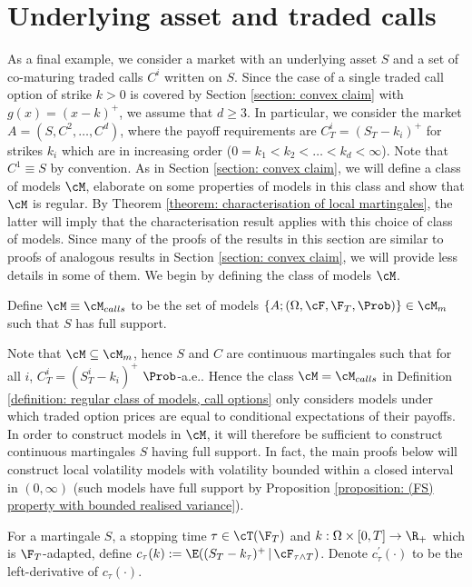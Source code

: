\documentclass[11pt]{article}
\begin{document}
\section{Underlying asset and traded calls}
\label{section: traded calls}

As a final example, we consider a market with an underlying asset $S$ and a set of co-maturing traded calls $C^i$ written on $S$. Since the case of a single traded call option of strike $k > 0$ is covered by Section \ref{section: convex claim} with $g(x) = (x-k)^+$, we assume that $d \geq 3$. In particular, we consider the market $A = (S, C^2, \ldots, C^d)$, where the payoff requirements are $C^i_T = (S_T - k_i)^+$ for strikes $k_i$ which are in increasing order ($0 = k_1 < k_2 < \ldots < k_d < \infty$). Note that $C^1 \equiv S$ by convention. As in Section \ref{section: convex claim}, we will define a class of models $\cM$, elaborate on some properties of models in this class and show that $\cM$ is regular. By Theorem \ref{theorem: characterisation of local martingales}, the latter will imply that the characterisation result applies with this choice of class of models. Since many of the proofs of the results in this section are similar to proofs of analogous results in Section \ref{section: convex claim}, we will provide less details in some of them. We begin by defining the class of models $\cM$.

\begin{definition}
\label{definition: regular class of models, call options}
Define $\cM \equiv \cM_{calls}$ to be the set of models $\{ A; (\Omega, \cF, \F_T, \Prob) \} \in \cM_m$ such that $S$ has full support.
\end{definition}

Note that $\cM \subseteq \cM_m$, hence $S$ and $C$ are continuous martingales such that for all $i$, $C^i_T = (S^i_T - k_i)^+$ $\Prob$-a.e.. Hence the class $\cM = \cM_{calls}$ in Definition \ref{definition: regular class of models, call options} only considers models under which traded option prices are equal to conditional expectations of their payoffs. In order to construct models in $\cM$, it will therefore be sufficient to construct continuous martingales $S$ having full support. In fact, the main proofs below will construct local volatility models with volatility bounded within a closed interval in $(0,\infty)$ (such models have full support by Proposition \ref{proposition: (FS) property with bounded realised variance}).

\begin{definition}
\label{definition: time value and discretised slope}
For a martingale $S$, a stopping time $\tau \in \cT(\F_T)$ and $k: \Omega \times [0,T] \to \R_+$ which is $\F_T$-adapted, define $c_\tau(k) := \E((S_T - k_\tau)^+ \, | \, \cF_{\tau \wedge T})$. Denote $c^\prime_\tau(\cdot)$ to be the left-derivative of $c_\tau(\cdot)$.\end{definition}
\end{document}
